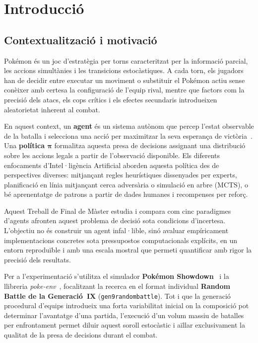 \chapter{Introducció}
\label{chap:introduccio}

\section{Contextualització i motivació}

Pokémon és un joc d'estratègia per torns caracteritzat per la informació parcial, les accions simultànies i les transicions estocàstiques. A cada torn, els jugadors han de decidir entre executar un moviment o substituir el Pokémon actiu sense conèixer amb certesa la configuració de l'equip rival, mentre que factors com la precisió dels atacs, els cops crítics i els efectes secundaris introdueixen aleatorietat inherent al combat.

En aquest context, un \textbf{agent} és un sistema autònom que percep l'estat observable de la batalla i selecciona una acció per maximitzar la seva esperança de victòria~\cite{russell_norvig,wooldridge_mas}. Una \textbf{política $\boldsymbol{\pi}$} formalitza aquesta presa de decisions assignant una distribució sobre les accions legals a partir de l'observació disponible. Els diferents enfocaments d'Intel·ligència Artificial aborden aquesta política des de perspectives diverses: mitjançant regles heurístiques dissenyades per experts, planificació en línia mitjançant cerca adversària o simulació en arbre (MCTS), o bé aprenentatge de patrons a partir de dades humanes i recompenses per reforç.

Aquest Treball de Final de Màster estudia i compara com cinc paradigmes d'agents afronten aquest problema de decisió sota condicions d'incertesa. L'objectiu no és construir un agent infal·lible, sinó avaluar empíricament implementacions concretes sota pressupostos computacionals explícits, en un entorn reproduïble i amb una escala mostral que permeti quantificar amb rigor la precisió dels resultats.

Per a l'experimentació s'utilitza el simulador \textbf{Pokémon Showdown}~\cite{pokemon_showdown} i la llibreria \textit{poke-env}~\cite{poke_env}, focalitzant la recerca en el format individual \textbf{Random Battle de la Generació~IX} (\texttt{gen9randombattle}). Tot i que la generació procedural d'equips introdueix una forta variabilitat inicial on la composició pot determinar l'avantatge d'una partida, l'execució d'un volum massiu de batalles per enfrontament permet diluir aquest soroll estocàstic i aïllar exclusivament la qualitat de la presa de decisions durant el combat.

